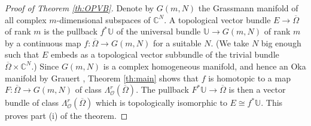 \documentclass[11pt]{amsart}
\numberwithin{equation}{section}
\theoremstyle{definition}
\newcommand\Oscr{\mathscr{O}}
\newcommand\C{\mathbb{C}}
\newcommand\U{\mathbb{U}}
\begin{document}
\begin{proof}[Proof of Theorem \ref{th:OPVB}]
Denote by $G(m,N)$ the Grassmann manifold 
of all complex $m$-dimensional subspaces of $\C^N$.
A topological vector bundle $E \to \overline\Omega$ of rank $m$ is 
the pullback $f^*\U$ of the universal bundle $\U\to G(m,N)$ of rank $m$
by a continuous map $f:\overline\Omega\to G(m,N)$ for a suitable $N$.
(We take $N$ big enough such that $E$ embeds as a topological
vector subbundle of the trivial bundle $\overline\Omega \times \C^N$.)
Since $G(m,N)$ is a complex homogeneous manifold, and hence an 
Oka manifold by Grauert \cite{Grauert1957II}, 
Theorem \ref{th:main} shows that $f$ is 
homotopic to a map $F:\overline\Omega \to G(m,N)$ 
of class $\Lambda^r_\Oscr(\overline\Omega)$.
The pullback $F^*\U\to \overline\Omega$ is then a 
vector bundle of class $\Lambda^r_\Oscr(\overline\Omega)$
which is topologically isomorphic to $E\cong f^*\U$. 
This proves part (i) of the theorem.


\end{proof}
\end{document}
